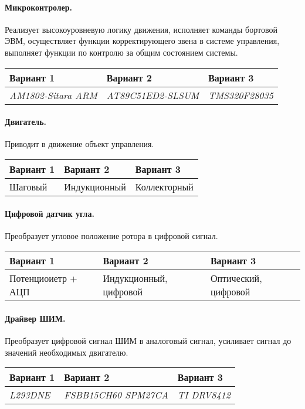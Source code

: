 \paragraph{Микроконтролер.}
Реализует высокоуровневую логику движения,
исполняет команды бортовой ЭВМ, осуществляет функции корректирующего
звена в системе управления, выполняет функции по контролю за общим
состоянием системы.

\begin{tabular}{|p{5cm}|p{5cm}|p{5cm}|}
    \hline
    Вариант 1 & Вариант 2 & Вариант 3 \\
    \hline
    \textit{AM1802-Sitara ARM} &
    \textit{AT89C51ED2-SLSUM} &
    \textit{TMS320F28035} \\
    \hline
\end{tabular}

\paragraph{Двигатель.}
Приводит в движение объект управления.

\begin{tabular}{|p{5cm}|p{5cm}|p{5cm}|}
    \hline
    Вариант 1 & Вариант 2 & Вариант 3 \\
    \hline
    Шаговый &
    Индукционный &
    Коллекторный \\
    \hline
\end{tabular}

\paragraph{Цифровой датчик угла.}
Преобразует угловое положение ротора в цифровой сигнал.

\begin{tabular}{|p{5cm}|p{5cm}|p{5cm}|}
    \hline
    Вариант 1 & Вариант 2 & Вариант 3 \\
    \hline
    Потенциоиетр + АЦП &
    Индукционный, цифровой &
    Оптический, цифровой \\
    \hline
\end{tabular}

\paragraph{Драйвер ШИМ.}
Преобразует цифровой сигнал ШИМ в аналоговый сигнал,
усиливает сигнал до значений необходимых двигателю.

\begin{tabular}{|p{5cm}|p{5cm}|p{5cm}|}
    \hline
    Вариант 1 & Вариант 2 & Вариант 3 \\
    \hline
    \textit{L293DNE} &
    \textit{FSBB15CH60 SPM27CA} &
    \textit{TI DRV8412} \\
    \hline
\end{tabular}

